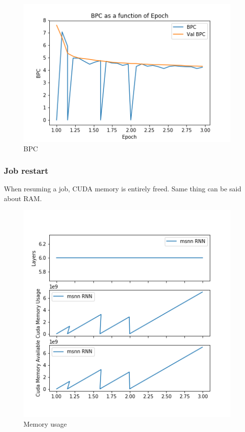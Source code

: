 \begin{figure}[ht]
\centering
\includegraphics[width=\textwidth]{parts/appendix/reports-gmsnn/docs_esteban-latex/test_reports/2018-06-11/frac_val_bpc.png}
\caption{BPC}
\end{figure}


\newpage
\subsubsection{Job restart}\label{job-restart}

When resuming a job, CUDA memory is entirely freed. Same thing can be
said about RAM.

\begin{figure}[h]
\centering
\includegraphics[width=\textwidth]{parts/appendix/reports-gmsnn/docs_esteban-latex/test_reports/2018-06-11/memory.png}
\caption{Memory usage}
\end{figure}

